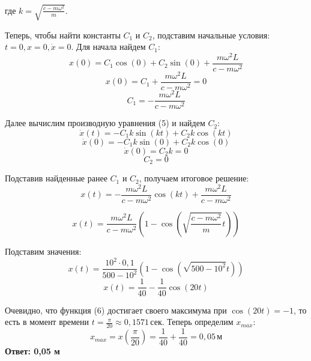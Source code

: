 \documentclass{article}
\begin{document}
где \(\displaystyle k = \sqrt{\frac{c - m\omega^2}{m}}\). \par
\vspace*{2pt}
Теперь, чтобы найти константы $C_1$ и $C_2$, подставим начальные условия: $t = 0, x = 0, \dot{x} = 0$. Для начала найдем $C_1$:
\begin{equation*}
	x(0) = C_1 \cos(0) + C_2 \sin(0) + \frac{m\omega^2 L}{c - m\omega^2}
\end{equation*}
\begin{equation*}
	x(0) = C_1 + \frac{m\omega^2 L}{c - m\omega^2} = 0
\end{equation*}
\begin{equation*}
	C_1 = -\frac{m\omega^2 L}{c - m\omega^2}
\end{equation*}
\par
Далее вычислим производную уравнения (5) и найдем $C_2$:
\begin{equation*}
	\dot{x}(t) = -C_1 k \sin(k t) + C_2 k \cos(k t)
\end{equation*}
\begin{equation*}
	\dot{x}(0) = -C_1 k \sin(0) + C_2 k \cos(0)
\end{equation*}
\begin{equation*}
	\dot{x}(0) = C_2 k = 0
\end{equation*}
\begin{equation*}
	 C_2 = 0
\end{equation*}
\par
Подставив найденные ранее $C_1$ и $C_2$, получаем итоговое решение:
\begin{equation*}
	\boxed{x(t) = -\frac{m\omega^2 L}{c - m\omega^2} \cos(kt) + \frac{m\omega^2 L}{c - m\omega^2}}
\end{equation*}
\par
\begin{equation*}
	x(t) = \frac{m\omega^2 L}{c - m\omega^2} (1 - \cos(\sqrt{\frac{c - m\omega^2}{m}}t))
\end{equation*}
\par
Подставим значения:
\begin{equation*}
	x(t) = \frac{10^2 \cdot 0,1}{500 - 10^2} (1 - \cos(\sqrt{500 - 10^2}t))
\end{equation*}
\begin{equation}
	x(t) = \frac{1}{40} - \frac{1}{40}\cos(20t)
\end{equation}
\par
Очевидно, что функция (6) достигает своего максимума при $\cos(20t) = -1$, то есть в момент времени $t = \frac{\pi}{20} \approx 0,1571	 \, \text{сек}$. Теперь определим $x_{max}$:
\begin{equation*}
	x_{max} = x(\frac{\pi}{20}) = \frac{1}{40} + \frac{1}{40} = 0,05 \, \text{м}
\end{equation*}
\hspace{13cm}
\textbf{Ответ: 0,05 м}
\end{document}
